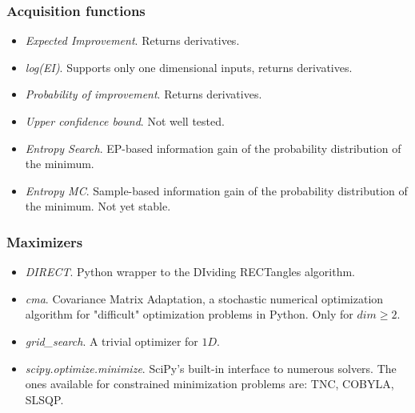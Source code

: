 \documentclass[10pt,handout]{beamer}
\begin{document}
\begin{frame}
\frametitle{Acquisition functions}

\begin{itemize}
\item \textit{Expected Improvement}. Returns derivatives.
\item \textit{log(EI)}. Supports only one dimensional inputs, returns derivatives.
\item \textit{Probability of improvement}. Returns derivatives.
\item \textit{Upper confidence bound}. Not well tested.
\item \textit{Entropy Search}. EP-based information gain of the probability distribution
of the minimum.
\item \textit{Entropy MC}. Sample-based information gain of the probability distribution
of the minimum. Not yet stable.

\end{itemize}

\end{frame}

\begin{frame}
\frametitle{Maximizers}



\begin{itemize}

\item \textit{DIRECT}. Python wrapper to the DIviding RECTangles algorithm.
\item \textit{cma}. Covariance Matrix Adaptation, a stochastic numerical
optimization algorithm for "difficult" optimization problems in Python. Only
for $dim \geq 2$.
\item \textit{grid\_search}. A trivial optimizer for $1D$.
\item \textit{scipy.optimize.minimize}. SciPy's built-in interface to numerous
solvers. The ones available for constrained minimization problems are: %
TNC, COBYLA, SLSQP.


\end{itemize}

\end{frame}
\end{document}
